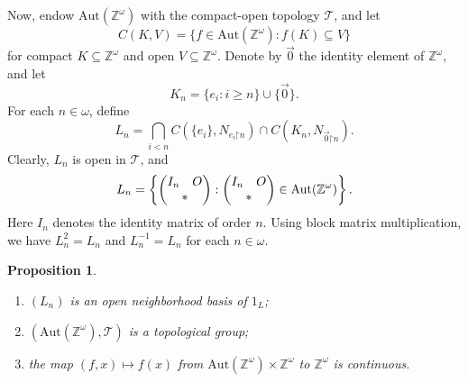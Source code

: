 \documentclass[11pt]{amsart}
\newtheorem{proposition}[theorem]{Proposition}
\theoremstyle{definition}
\theoremstyle{remark}
\numberwithin{equation}{section}
\def\Z {{\mathbb{Z}}}
\renewcommand{\restriction}{\mathord{\upharpoonright}}
\def\aut{{\mathrm{Aut}}}
\begin{document}
Now, endow $\aut(\Z^\omega)$ with the compact-open topology $\mathcal{T}$, and let
$$C(K,V)=\{f\in\aut(\Z^\omega):f(K)\subseteq V\}$$
for compact $K\subseteq\Z^\omega$ and open $V\subseteq\Z^\omega$.
Denote by $\vec{0}$ the identity element of $\Z^\omega$, and let
$$K_n=\{e_i:i\geq n\}\cup\{\vec{0}\}.$$
For each $n\in\omega$, define
$$L_n=\bigcap_{i<n}C(\{e_i\},N_{e_i\restriction n})\cap C(K_n,N_{\vec{0}\restriction n}).$$
Clearly, $L_n$ is open in $\mathcal{T}$, and
\begin{equation*}
    L_n=\left\{\begin{pmatrix}
    I_n & O \\
    \multicolumn{2}{c}{*}
    \end{pmatrix}:\begin{pmatrix}
    I_n & O \\
    \multicolumn{2}{c}{*}
    \end{pmatrix}\in\aut(\Z^\omega)\right\}.
\end{equation*}
Here $I_n$ denotes the identity matrix of order $n$. Using block matrix multiplication, we have $L_n^2=L_n$ and $L_n^{-1}=L_n$ for each $n\in\omega$.

\begin{proposition}\label{property of autZw}
    \begin{enumerate}
        \item $(L_n)$ is an open neighborhood basis of $1_L$;
        \item $(\aut(\Z^\omega),\mathcal{T})$ is a topological group;
        \item the map $(f,x)\mapsto f(x)$ from $\aut(\Z^\omega)\times\Z^\omega$ to $\Z^\omega$ is continuous.
    \end{enumerate}
\end{proposition}
\end{document}
